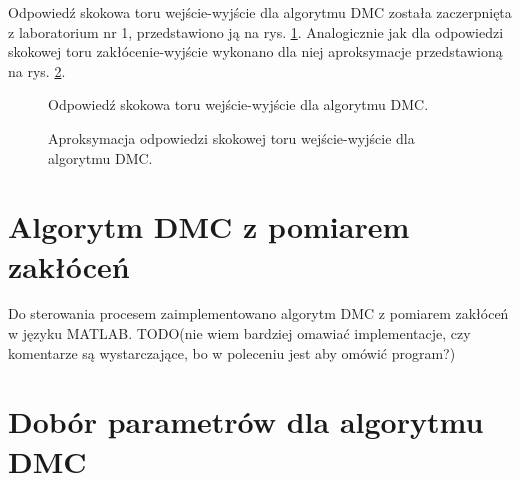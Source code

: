 \documentclass[a4paper,titlepage,11pt,twosides,floatssmall]{mwrep}
\begin{document}
Odpowiedź skokowa toru wejście-wyjście dla algorytmu DMC została zaczerpnięta z laboratorium nr 1, przedstawiono ją na rys. \ref{skok_DMC}. Analogicznie jak dla odpowiedzi skokowej toru zakłócenie-wyjście wykonano dla niej aproksymacje przedstawioną na rys. \ref{skok_DMC_apro}.

\begin{figure}[H]
	\centering
	
	\caption{Odpowiedź skokowa toru wejście-wyjście dla algorytmu DMC.}
	\label{skok_DMC}
\end{figure}

	
\begin{figure}[H]
	\centering
	
	\caption{Aproksymacja odpowiedzi skokowej toru wejście-wyjście dla algorytmu DMC.}
	\label{skok_DMC_apro}
\end{figure}

\section{Algorytm DMC z pomiarem zakłóceń}
Do sterowania procesem zaimplementowano algorytm DMC z pomiarem zakłóceń w języku MATLAB. TODO(nie wiem bardziej omawiać implementacje, czy komentarze są wystarczające, bo w poleceniu jest aby omówić program?)




\section{Dobór parametrów dla algorytmu DMC}
\end{document}
